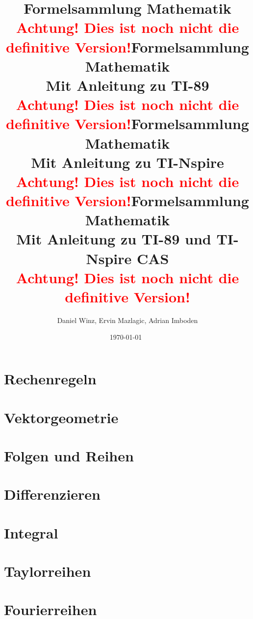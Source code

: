 \documentclass[a5paper,10pt,fleqn]{book}
\title{Formelsammlung Mathematik\\\textcolor{red}{\textbf{\Huge{Achtung! Dies ist noch nicht die definitive Version!}}}}
\title{Formelsammlung Mathematik \\ Mit Anleitung zu TI-89\\\textcolor{red}{\textbf{\Huge{Achtung! Dies ist noch nicht die definitive Version!}}}}
\title{Formelsammlung Mathematik \\ Mit Anleitung zu TI-Nspire\\\textcolor{red}{\textbf{\Huge{Achtung! Dies ist noch nicht die definitive Version!}}}}
\title{Formelsammlung Mathematik \\ Mit Anleitung zu TI-89 und TI-Nspire CAS \\\textcolor{red}{\textbf{\Huge{Achtung! Dies ist noch nicht die definitive Version!}}}}
\author{Daniel Winz, Ervin Mazlagic, Adrian Imboden}
\date{\today~\dtc}
\begin{document}
\maketitle



\tableofcontents

\chapter{Rechenregeln}



\chapter{Vektorgeometrie}


\chapter{Folgen und Reihen}



\chapter{Differenzieren}




\chapter{Integral}




\chapter{Taylorreihen}


\chapter{Fourierreihen}

\end{document}
